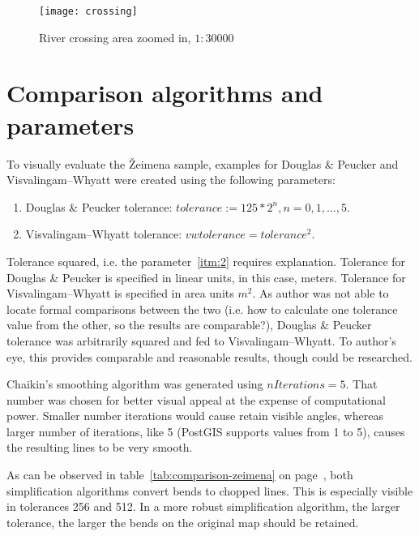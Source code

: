 \documentclass[a4paper]{article}
\newcommand{\DP}{Douglas \& Peucker}
\newcommand{\VW}{Visvalingam--Whyatt}
\begin{document}
\begin{figure}[h]
    \centering
    \texttt{[image: crossing]}
    \caption{River crossing area zoomed in, $1:30 000$}
    \label{fig:crossing}
\end{figure}

\section{Comparison algorithms and parameters}
\label{sec:algs-and-params}

To visually evaluate the Žeimena sample, examples for {\DP} and {\VW}
were created using the following parameters:

\begin{enumerate}[label=(\Roman*)]
    \item {\DP} tolerance: $tolerance := 125 * 2^n, n = 0,1,...,5$.
    \item {\VW} tolerance: $vwtolerance = tolerance ^ 2$\label{itm:2}.
\end{enumerate}

Tolerance squared, i.e. the parameter~\ref{itm:2} requires explanation.
Tolerance for {\DP} is specified in linear units, in this case, meters.
Tolerance for {\VW} is specified in area units $m^2$. As author was not able to
locate formal comparisons between the two (i.e. how to calculate one tolerance
value from the other, so the results are comparable?), {\DP} tolerance was
arbitrarily squared and fed to {\VW}. To author's eye, this provides comparable
and reasonable results, though could be researched.

Chaikin's smoothing algorithm was generated using $nIterations = 5$. That
number was chosen for better visual appeal at the expense of computational
power. Smaller number iterations would cause retain visible angles, whereas
larger number of iterations, like 5 (PostGIS supports values from 1 to 5),
causes the resulting lines to be very smooth.

As can be observed in table~\ref{tab:comparison-zeimena} on
page~\pageref{tab:comparison-zeimena}, both simplification algorithms convert
bends to chopped lines. This is especially visible in tolerances 256 and 512.
In a more robust simplification algorithm, the larger tolerance, the larger the
bends on the original map should be retained.
\end{document}
